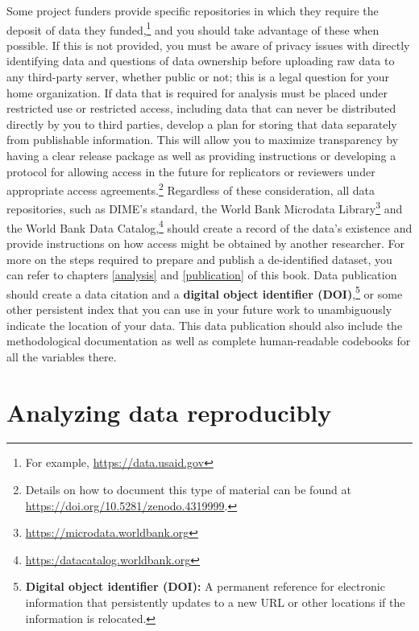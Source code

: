 \documentclass[
]{book}
\begin{document}
Some project funders
provide specific repositories in which they require the deposit of data they funded,\footnote{For example, \url{https://data.usaid.gov}}
and you should take advantage of these when possible.
If this is not provided, you must be aware of privacy issues
with directly identifying data and questions of data ownership
before uploading raw data to any third-party server, whether public or not;
this is a legal question for your home organization.
If data that is required for analysis must be placed under restricted use or restricted access,
including data that can never be distributed directly by you to third parties,
develop a plan for storing that data separately from publishable information.
This will allow you to maximize transparency by having a clear release package
as well as providing instructions or developing a protocol for allowing access in the future
for replicators or reviewers under appropriate access agreements.\footnote{Details on how to document this type of material can be found at
  \url{https://doi.org/10.5281/zenodo.4319999}.}
Regardless of these consideration, all data repositories,
such as DIME's standard, the World Bank Microdata Library\footnote{\url{https://microdata.worldbank.org}}
and the World Bank Data Catalog,\footnote{\url{https:/datacatalog.worldbank.org}}
should create a record of the data's existence
and provide instructions on how access might be obtained by another researcher.
For more on the steps required to prepare and publish a de-identified dataset,
you can refer to chapters \ref{analysis} and \ref{publication} of this book.
Data publication should create a data citation and a \textbf{digital object identifier (DOI)},\footnote{\textbf{Digital object identifier (DOI):} A permanent reference for electronic information
  that persistently updates to a new URL or other locations if the information is relocated.}
or some other persistent index that you can use in your future work
to unambiguously indicate the location of your data.
This data publication should also include the methodological documentation
as well as complete human-readable codebooks for all the variables there.

\hypertarget{analyzing-data-reproducibly}{%
\section*{Analyzing data reproducibly}\label{analyzing-data-reproducibly}}
\end{document}
